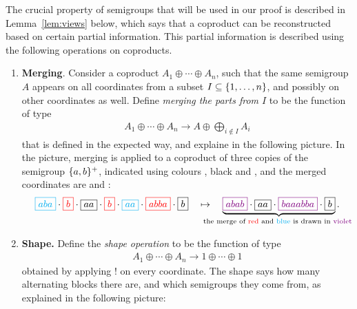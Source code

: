 
The crucial property of semigroups that will be used in our proof is described in Lemma~\ref{lem:views} below, which says that a coproduct can be reconstructed based on certain partial information. This partial information is described  using the following operations on coproducts.

\begin{enumerate}
    \item \textbf{Merging}. Consider a coproduct $A_1 \oplus \cdots \oplus A_n$, such that the same semigroup $A$ appears on all coordinates from a subset $I \subseteq \{1,\ldots,n\}$, and possibly on other coordinates as well. Define \emph{merging the parts from $I$} to be the function of type 
    \begin{align*}
        A_1 \oplus \cdots \oplus A_n \to  A \oplus \bigoplus_{i \not \in I} A_i
        \end{align*}
    that is defined in the expected way, and explaine in the following picture. In the picture, merging is applied to  a coproduct of three copies of the semigroup $\{a,b\}^+$, indicated using colours , black and , and the merged coordinates are  and :
        \begin{align*}
        \blue{\boxed{aba}} \cdot 
        \red{\boxed{b}} \cdot 
        \boxed{aa} \cdot 
        \red{\boxed{b}} \cdot 
        \blue{\boxed{aa}} \cdot 
        \red{\boxed{abba}} \cdot 
        \boxed{b}
        \quad \mapsto \quad  
        \myunderbrace{
            \violet{\boxed{abab}} \cdot 
        \boxed{aa} \cdot 
        \violet{\boxed{baaabba}} \cdot 
        \boxed{b}
        }{the merge of \red{red} and \blue{blue} is drawn in \violet{violet}}.\end{align*}    
        \item \textbf {Shape.}  Define the \emph{shape operation} to be the function of type 
        \begin{align*}
        A_1 \oplus \cdots \oplus A_n \to 1 \oplus \cdots \oplus 1
        \end{align*}
        obtained by applying $!$ on every coordinate. The shape says how many alternating blocks there are, and which semigroups they come from, as explained in the following picture:
        \begin{align*}

\end{align*}
\end{enumerate}

